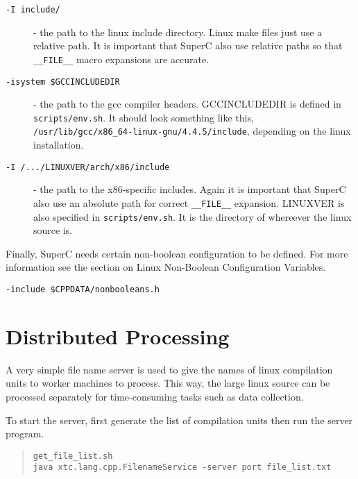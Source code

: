 \documentclass{report}
\begin{document}
\begin{description}
\item[\texttt{-I include/}] - the path to the linux include directory.  Linux
  make files just use a relative path.  It is important that SuperC
  also use relative paths so that \verb'__FILE__' macro expansions are
  accurate.

\item[\texttt{-isystem \$GCCINCLUDEDIR}] - the path to the gcc compiler
  headers.  GCCINCLUDEDIR is defined in \verb"scripts/env.sh".  It should
  look something like this,
  \verb"/usr/lib/gcc/x86_64-linux-gnu/4.4.5/include", depending on the
  linux installation.

\item[\texttt{-I /.../LINUXVER/arch/x86/include}] - the path to the
  x86-specific includes.  Again it is important that SuperC also use
  an absolute path for correct \verb'__FILE__' expansion.  LINUXVER is
  also specified in \verb"scripts/env.sh".  It is the directory of
  whereever the linux source is.
\end{description}

Finally, SuperC needs certain non-boolean configuration to be defined.
For more information see the section on Linux Non-Boolean
Configuration Variables.

\begin{description}
\item[\texttt{-include \$CPPDATA/nonbooleans.h}]
\end{description}



\section{Distributed Processing}
\label{section:worker}

A very simple file name server is used to give the names of linux
compilation units to worker machines to process.  This way, the large
linux source can be processed separately for time-consuming tasks such
as data collection.

To start the server, first generate the list of compilation units then
run the server program.

\begin{quote}
\begin{verbatim}
get_file_list.sh
java xtc.lang.cpp.FilenameService -server port file_list.txt
\end{verbatim}
\end{quote}
\end{document}
